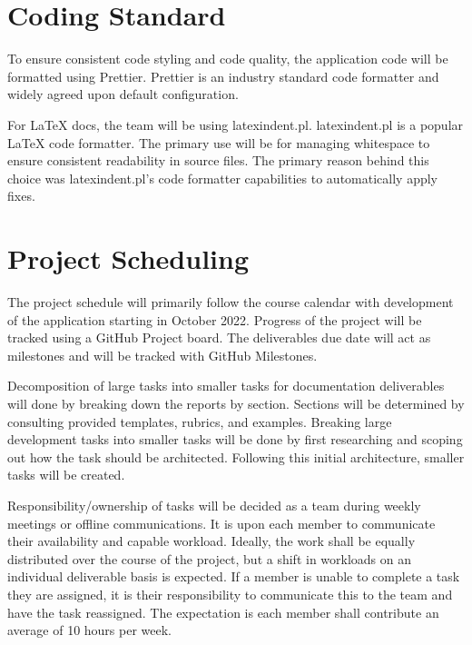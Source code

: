 \documentclass{article}
\begin{document}
\section{Coding Standard}

To ensure consistent code styling and code quality, the application code will be formatted using
Prettier. Prettier is an industry standard code formatter and widely agreed upon default
configuration.

For \LaTeX{} docs, the team will be using latexindent.pl. latexindent.pl is a popular \LaTeX{} code
formatter. The primary use will be for managing whitespace to ensure consistent readability in
source files. The primary reason behind this choice was latexindent.pl's code formatter
capabilities to automatically apply fixes.

\section{Project Scheduling}


The project schedule will primarily follow the course calendar with development of the application
starting in October 2022. Progress of the project will be tracked using a GitHub Project board. The
deliverables due date will act as milestones and will be tracked with GitHub Milestones.

Decomposition of large tasks into smaller tasks for documentation deliverables will done by breaking
down the reports by section. Sections will be determined by consulting provided templates, rubrics,
and examples. Breaking large development tasks into smaller tasks will be done by first researching
and scoping out how the task should be architected. Following this initial architecture, smaller
tasks will be created.

Responsibility/ownership of tasks will be decided as a team during weekly meetings or offline
communications. It is upon each member to communicate their availability and capable workload.
Ideally, the work shall be equally distributed over the course of the project, but a shift in
workloads on an individual deliverable basis is expected. If a member is unable to complete a task
they are assigned, it is their responsibility to communicate this to the team and have the task
reassigned. The expectation is each member shall contribute an average of 10 hours per week.
\end{document}
